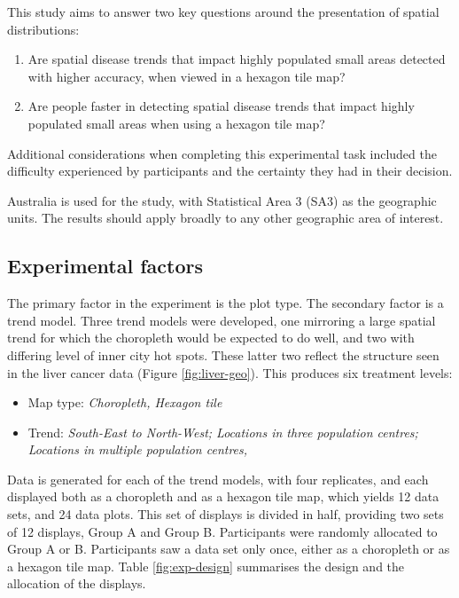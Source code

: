 \documentclass{monashthesis}
\begin{document}
This study aims to answer two key questions around the presentation of spatial distributions:

\begin{enumerate}
\def\labelenumi{\arabic{enumi}.}
\tightlist
\item
  Are spatial disease trends that impact highly populated small areas detected with higher accuracy, when viewed in a hexagon tile map?
\item
  Are people faster in detecting spatial disease trends that impact highly populated small areas when using a hexagon tile map?
\end{enumerate}

Additional considerations when completing this experimental task included the difficulty experienced by participants and the certainty they had in their decision.

Australia is used for the study, with Statistical Area 3 (SA3) \autocite{abs2016} as the geographic units. The results should apply broadly to any other geographic area of interest.

\hypertarget{experimental-factors}{%
\subsection{Experimental factors}\label{experimental-factors}}

The primary factor in the experiment is the plot type. The secondary factor is a trend model. Three trend models were developed, one mirroring a large spatial trend for which the choropleth would be expected to do well, and two with differing level of inner city hot spots. These latter two reflect the structure seen in the liver cancer data (Figure \ref{fig:liver-geo}). This produces six treatment levels:

\begin{itemize}
\tightlist
\item
  Map type: \emph{Choropleth, Hexagon tile}
\item
  Trend: \emph{South-East to North-West; Locations in three population centres; Locations in multiple population centres, }
\end{itemize}

Data is generated for each of the trend models, with four replicates, and each displayed both as a choropleth and as a hexagon tile map, which yields 12 data sets, and 24 data plots. This set of displays is divided in half, providing two sets of 12 displays, Group A and Group B. Participants were randomly allocated to Group A or B. Participants saw a data set only once, either as a choropleth or as a hexagon tile map. Table \ref{fig:exp-design} summarises the design and the allocation of the displays.
\end{document}
